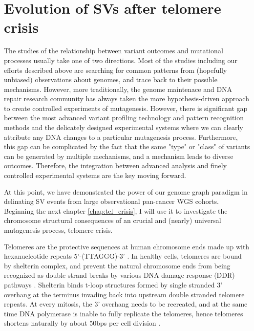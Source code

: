 \documentclass[phd,tocprelim]{cornell}
\begin{document}
\section{Evolution of SVs after telomere crisis}
The studies of the relationship between variant outcomes and mutational processes usually take one of two directions. Most of the studies including our efforts described above are searching for common patterns from (hopefully unbiased) observations about genomes, and trace back to their possible mechanisms. However, more traditionally, the genome maintenace and DNA repair research community has always taken the more hypothesis-driven approach to create controlled experiments of mutagenesis. However, there is significant gap between the most advanced variant profiling technology and pattern recognition methods and the delicately designed experimental systems where we can clearly attribute any DNA changes to a particular mutagenesis process. Furthermore, this gap can be complicated by the fact that the same "type" or "class" of variants can be generated by multiple mechanisms, and a mechanism leads to diverse outcomes. Therefore, the integration between advanced analysis and finely controlled experimental systems are the key moving forward.

At this point, we have demonstrated the power of our genome graph paradigm in delinating SV events from large observational pan-cancer WGS cohorts. Beginning the next chapter \ref{chap:tel_crisis}, I will use it to investigate the chromosome structural consequences of an crucial and (nearly) universal mutagenesis process, telomere crisis.

Telomeres are the protective sequences at human chromosome ends made up with hexanucleotide repeats 5'-(TTAGGG)-3' \cite{De_Lange1990-mz}. In healthy cells, telomeres are bound by shelterin complex, and prevent the natural chromosome ends from being recognized as double strand breaks by various DNA damage response (DDR) pathways \cite{De_Lange2005-cn}. Shelterin binds t-loop structures formed by single stranded 3' overhang at the terminus invading back into upstream double stranded telomere repeats. At every mitosis, the 3' overhang needs to be recreated, and at the same time DNA polymerase is inable to fully replicate the telomeres, hence telomeres shortens naturally by about 50bps per cell division \cite{De_Lange2005-cn}. 
\end{document}
